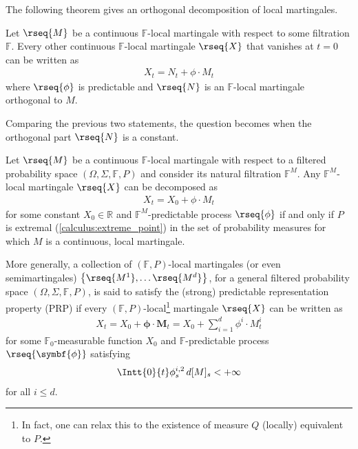     The following theorem gives an orthogonal decomposition of local martingales.
    \begin{theorem}
        Let $\rseq{M}$ be a continuous $\mathbb{F}$-local martingale with respect to some filtration $\mathbb{F}$. Every other continuous $\mathbb{F}$-local martingale $\rseq{X}$ that vanishes at $t=0$ can be written as
        \begin{gather}
            X_t = N_t + \phi\cdot M_t
        \end{gather}
        where $\rseq{\phi}$ is predictable and $\rseq{N}$ is an $\mathbb{F}$-local martingale orthogonal to $M$.
    \end{theorem}

    Comparing the previous two statements, the question becomes when the orthogonal part $\rseq{N}$ is a constant.
    \begin{theorem}\label{stoch:prp}
        Let $\rseq{M}$ be a continuous $\mathbb{F}$-local martingale with respect to a filtered probability space $(\Omega,\Sigma,\mathbb{F},P)$ and consider its natural filtration $\mathbb{F}^M$. Any $\mathbb{F}^M$-local martingale $\rseq{X}$ can be decomposed as
        \begin{gather}
            X_t = X_0 + \phi\cdot M_t
        \end{gather}
        for some constant $X_0\in\mathbb{R}$ and $\mathbb{F}^M$-predictable process $\rseq{\phi}$ if and only if $P$ is extremal (\cref{calculus:extreme_point}) in the set of probability measures for which $M$ is a continuous, local martingale.
    \end{theorem}

    \begin{remark}[Generalization]
        More generally, a collection of $(\mathbb{F},P)$-local martingales (or even semimartingales) $\bigl\{\rseq{M^1},\ldots\rseq{M^d}\bigr\}$, for a general filtered probability space $(\Omega,\Sigma,\mathbb{F},P)$, is said to satisfy the (strong) predictable representation property (PRP) if every $(\mathbb{F},P)$-local\footnote{In fact, one can relax this to the existence of measure $Q$ (locally) equivalent to $P$.} martingale $\rseq{X}$ can be written as
        \begin{gather}
            X_t = X_0 + \symbf{\phi}\cdot\mathbf{M}_t = X_0 + \sum_{i=1}^d\phi^i\cdot M^i_t
        \end{gather}
        for some $\mathbb{F}_0$-measurable function $X_0$ and $\mathbb{F}$-predictable process $\rseq{\symbf{\phi}}$ satisfying
        \begin{gather}
            \Intt{0}{t}\phi_s^{i,2}\,d[M]_s<+\infty
        \end{gather}
        for all $i\leq d$.
    \end{remark}

